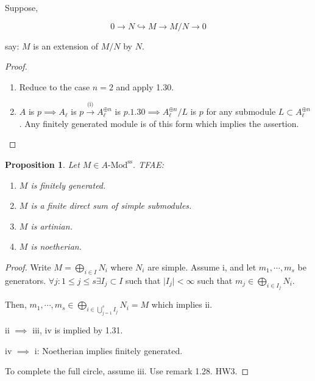 \documentclass{article}
\theoremstyle{definition}
\theoremstyle{plain}
\newtheorem{proposition}[theorem]{Proposition}
\theoremstyle{remark}
\begin{document}
    Suppose,

    \[
        0 \to N \hookrightarrow M \to M / N \to 0
    \]

    say: \(M\) is an extension of \(M / N\) by \(N\).

    \begin{proof}
        \begin{enumerate}[label=\roman*)]
            \item Reduce to the case \(n = 2\) and apply 1.30.
            \item \(A\) is \(p \implies A_\ell\) is \(p \xrightarrow{\text{(i)}} A_\ell^{\oplus n}\) is \(p. 1.30 \implies A_\ell^{\oplus n} / L\) is \(p\) for any submodule \(L \subset A_\ell^{\oplus n}\). Any finitely generated module is of this form which implies the assertion.  
        \end{enumerate} 
    \end{proof}

    \begin{proposition}
        Let \(M \in A\text{-Mod}^{\text{ss}}\). TFAE:

        \begin{enumerate}[label=\roman*)]
            \item \(M\) is finitely generated.
            \item \(M\) is a finite direct sum of simple submodules.
            \item \(M\) is artinian.
            \item \(M\) is noetherian. 
        \end{enumerate} 
    \end{proposition}

    \begin{proof}
        Write \(M = \bigoplus_{i\in I} N_i\) where \(N_i\) are simple. Assume i, and let \(m_1 , \cdots , m_s\) be generators. \(\forall j : 1 \leq j \leq s \exists I_j \subset I\) such that \(\vert I_j \vert < \infty\) such that \(m_j \in \bigoplus_{i\in I_j} N_i\).
        
        Then, \(m_1 , \cdots , m_s \in \bigoplus_{i\in \bigcup_{j=1}^s I_j} N_i = M\) which implies ii.
        
        ii \(\implies\) iii, iv is implied by 1.31.

        iv \(\implies\) i: Noetherian implies finitely generated.

        To complete the full circle, assume iii. Use remark 1.28. HW3.
    \end{proof}
\end{document}
